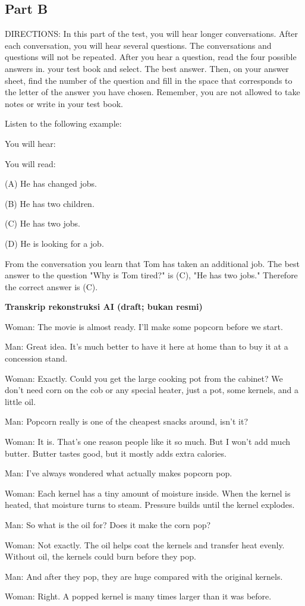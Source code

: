 \documentclass[12pt]{article}
\begin{document}
\subsection*{Part B}
DIRECTIONS: In this part of the test, you will hear longer conversations. After each conversation, you will hear several questions. The conversations and questions will not be repeated. After you hear a question, read the four possible answers in. your test book and select. The best answer. Then, on your answer sheet, find the number of the question and fill in the space that corresponds to the letter of the answer you have chosen. Remember, you are not allowed to take notes or write in your test book.\par
\begin{exampleblock}
Listen to the following example:\par
You will hear:\par
You will read:\par
(A) He has changed jobs.\par
(B) He has two children.\par
(C) He has two jobs.\par
(D) He is looking for a job.\par
From the conversation you learn that Tom has taken an additional job. The best answer to the question "Why is Tom tired?" is (C), "He has two jobs." Therefore the correct answer is (C).\par
\end{exampleblock}
\begin{exampleblock}
\textbf{Transkrip rekonstruksi AI (draft; bukan resmi)}\par
Woman: The movie is almost ready. I'll make some popcorn before we start.\par
Man: Great idea. It's much better to have it here at home than to buy it at a concession stand.\par
Woman: Exactly. Could you get the large cooking pot from the cabinet? We don't need corn on the cob or any special heater, just a pot, some kernels, and a little oil.\par
Man: Popcorn really is one of the cheapest snacks around, isn't it?\par
Woman: It is. That's one reason people like it so much. But I won't add much butter. Butter tastes good, but it mostly adds extra calories.\par
Man: I've always wondered what actually makes popcorn pop.\par
Woman: Each kernel has a tiny amount of moisture inside. When the kernel is heated, that moisture turns to steam. Pressure builds until the kernel explodes.\par
Man: So what is the oil for? Does it make the corn pop?\par
Woman: Not exactly. The oil helps coat the kernels and transfer heat evenly. Without oil, the kernels could burn before they pop.\par
Man: And after they pop, they are huge compared with the original kernels.\par
Woman: Right. A popped kernel is many times larger than it was before.\par
\end{exampleblock}
\end{document}
